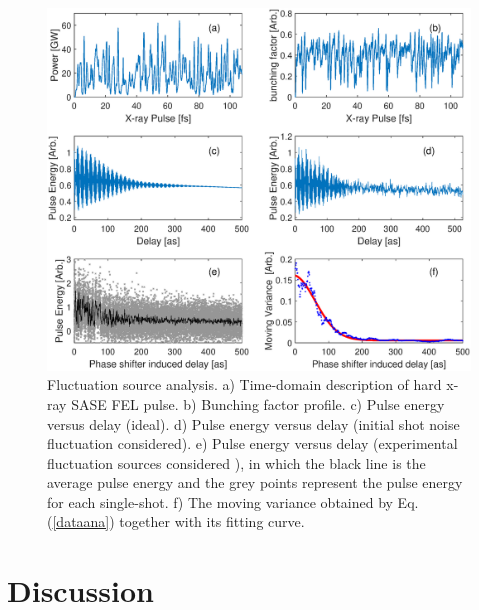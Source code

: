 \documentclass[%
 preprint,
 amsmath,amssymb,
 aps,
 prl,
 superscriptaddress,
 floatfix,
 letter,
]{revtex4-1}
\begin{document}
\begin{figure}[!htp]
 \centering
 \includegraphics[width=17cm,angle=0]{eg.eps}
 \caption{\label{fsim}
Fluctuation source analysis. a) Time-domain description of hard x-ray SASE FEL pulse. b) Bunching factor profile. c) Pulse energy versus delay (ideal).  d) Pulse energy versus delay (initial shot noise fluctuation considered). e) Pulse energy versus delay (experimental fluctuation sources considered ), in which the black line is the average pulse energy and the grey points represent the pulse energy for each single-shot. f) The moving variance obtained by Eq.(\ref{dataana}) together with its fitting curve.
 }
\end{figure}


\section{Discussion}
\end{document}
